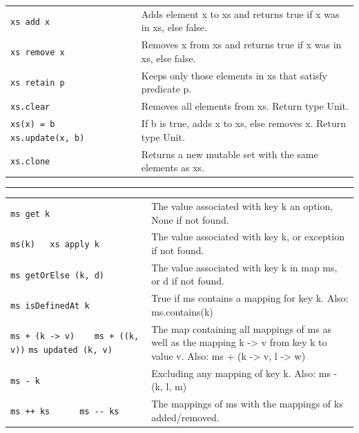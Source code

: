 \documentclass[article, a5paper]{memoir}
\newcommand{\LangColor}{red}
\newcommand{\head}[1]{{\bfseries {\color{\LangColor}{#1}}\par\vspace{1mm}\hrule\vspace{-2mm}}}
\renewcommand{\arraystretch}{0.9}
\newcommand{\Newline}{\vspace{\baselineskip}}
\begin{document}
{{\begin{tabular}{@{}p{5cm}  p{6.6cm}}
\texttt{xs add x} & Adds element x to xs and returns true if x was in xs, else false. \\\cline{1-2}
\texttt{xs remove x} & Removes x from xs and returns true if x was in xs, else false. \\\cline{1-2}

\texttt{xs retain p} & Keeps only those elements in xs that satisfy predicate p.\\   \cline{1-2}
\texttt{xs.clear} &  	Removes all elements from xs. Return type Unit.\\   \cline{1-2}
\texttt{xs(x) = b ~~~ xs.update(x, b)} & If b is true, adds x to xs, else removes x. Return type Unit.\\   \cline{1-2}
\texttt{xs.clone} & Returns a new mutable set with the same elements as xs.\\   \cline{1-2}
        
\end{tabular}
}  

\Newline
\head{Methods in trait \texttt{Map[K, V]}}\Newline

{\small\renewcommand{\arraystretch}{1.15}
\begin{tabular}{@{}p{5.0cm}  p{6.6cm}}

\texttt{ms get k} & The value associated with key k an option, None if not found.\\   \cline{1-2}

\texttt{ms(k)~~~xs~apply~k} & The value associated with key k, or exception if not found.\\   \cline{1-2}

\texttt{ms getOrElse (k, d)} & The value associated with key k in map ms, or d if not found.\\   \cline{1-2}

\texttt{ms isDefinedAt k} & True if ms contains a mapping for key k. Also: ms.contains(k) \\   \cline{1-2}


\texttt{ms + (k -> v)  ~~ ms + ((k, v))} \newline \texttt{ms updated (k, v)} & The map containing all mappings of ms as well as the mapping k -> v from key k to value v. Also: ms + (k -> v, l -> w) \\   \cline{1-2}

\texttt{ms - k} & Excluding any mapping of key k. Also: ms - (k, l, m)\\   \cline{1-2}

\texttt{ms ++ ks ~~~~ ms {-}{-} ks} & The mappings of ms with the mappings of ks added/removed.\\   \cline{1-2}


\end{tabular}}}
\end{document}
